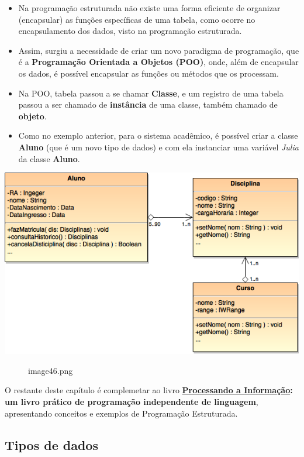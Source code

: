 \documentclass[12pt,a4paper]{article}
\begin{document}
    \begin{itemize}
\item
  Na programação estruturada não existe uma forma eficiente de organizar
  (encapsular) as funções específicas de uma tabela, como ocorre no
  encapsulamento dos dados, visto na programação estruturada.
\item
  Assim, surgiu a necessidade de criar um novo paradigma de programação,
  que é a \textbf{Programação Orientada a Objetos (POO)}, onde, além de
  encapsular os dados, é possível encapsular as funções ou métodos que
  os processam.
\item
  Na POO, tabela passou a se chamar \textbf{Classe}, e um registro de
  uma tabela passou a ser chamado de \textbf{instância} de uma classe,
  também chamado de \textbf{objeto}.
\item
  Como no exemplo anterior, para o sistema acadêmico, é possível criar a
  classe \textbf{Aluno} (que é um novo tipo de dados) e com ela
  instanciar uma variável \emph{Julia} da classe \textbf{Aluno}.
\end{itemize}

\includegraphics{"figs/image46.png"}

    \begin{figure}
\centering
\caption{image46.png}
\end{figure}

    O restante deste capítulo é complemetar ao livro
\textbf{\href{https://editora.ufabc.edu.br/matematica-e-ciencias-da-computacao/58-processando-a-informacao}{Processando
a Informação}: um livro prático de programação independente de
linguagem}, apresentando conceitos e exemplos de Programação
Estruturada.

    \hypertarget{tipos-de-dados}{%
\subsection{Tipos de dados}\label{tipos-de-dados}}
\end{document}
